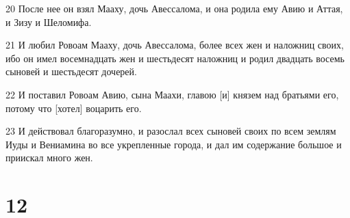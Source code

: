\par 20 После нее он взял Мааху, дочь Авессалома, и она родила ему Авию и Аттая, и Зизу и Шеломифа.
\par 21 И любил Ровоам Мааху, дочь Авессалома, более всех жен и наложниц своих, ибо он имел восемнадцать жен и шестьдесят наложниц и родил двадцать восемь сыновей и шестьдесят дочерей.
\par 22 И поставил Ровоам Авию, сына Маахи, главою [и] князем над братьями его, потому что [хотел] воцарить его.
\par 23 И действовал благоразумно, и разослал всех сыновей своих по всем землям Иуды и Вениамина во все укрепленные города, и дал им содержание большое и приискал много жен.

\chapter{12}

